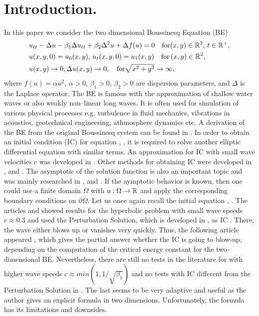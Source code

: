 \documentclass[11pt,a4paper,twoside]{article}
\begin{document}

\section{Introduction.}\label{introduction}

In this paper we  consider the two dimensional Boussinesq  Equation (BE)
\begin{align} \label{eq1}
&u_{tt} - \Delta u -\beta_1  \Delta u_{tt} +\beta_2 \Delta ^2 u + \Delta f(u)=0   \quad \text{for}  (x,y) \in \mathbb{R}^2, \, t\in\mathbb{R}^+, 
\\ \nonumber &u(x,y,0)=u_0(x,y), \, u_t(x,y,0)=u_1(x,y)   \quad\text{for} \, (x,y) \in \mathbb{R}^2,
\\  &u(x,y) \rightarrow 0,  \Delta u(x,y) \rightarrow 0 ,  \quad \text{for}  \sqrt{x^2 + y^2} \rightarrow \infty, \label{eq11}
\end{align}
where $f(u)=\alpha u^2$,  $\alpha>0$, $\beta_1>0$, $\beta_2>0$  are dispersion parameters, and $\Delta$ is the Laplace operator. The BE is famous with the approximation of shallow water waves or also weakly non--linear long waves. It is often used for simulation of various physical processes e.g. turbulence in fluid mechanics, vibrations in acoustics, geotechnical engineering, athmosphere dynamics etc. A derivation of the BE from the original Boussinesq system can be found in \cite{ChChr}. In order to obtain an initial condition (IC) for equation , , it is required to solve another elliptic differential equation with similar terms. An approximation for IC with small wave velocities $c$ was developed in \cite{Ch2011}. Other methods for obtaining IC were developed in \cite{chr-chr},\cite{chr-chr-07} and \cite{EllipticProblem}. The asymptotic of the solution function is also an important topic and was mainly researched in \cite{chr-chr-07}, \cite{Ch2012} and \cite{BoundaryProblem}. If the aymptotic behavior is known, then one could use a finite domain $\Omega$ with $u:\Omega \rightarrow \mathbb{R}$ and apply the corresponding boundary conditions on $\partial \Omega$. Let us once again recall the initial equation , . The articles \cite{cher} and \cite{dani} showed results for the hyperbolic problem  with small wave speeds $c \approx 0.3$ and used the Perturbation Solution, which is developed in \cite{Ch2011}, as IC . There, the wave either blows up or vanishes very quickly. Thus, the following article appeared \cite{critEn}, which gives the partial answer whether the IC is going to blow-up, depending on the computation of the critical energy constant for the two-dimensional BE. Nevertheless, there are still no tests in the literature for  with higher wave speeds $c \approx min(1, 1/\sqrt{\beta_1})$ and no tests with IC different from the Perturbation Solution in \cite{Ch2011}. The last seems to be very adaptive and useful as the author gives an explicit formula in two dimensions. Unfortunately, the formula has its limitations and downsides. 
\end{document}
